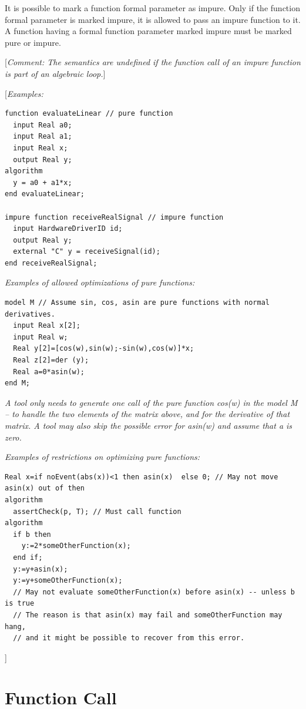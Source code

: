 \documentclass[10pt,a4paper]{report}
\def\doublelabel#1{\label{#1}}
\begin{document}
It is possible to mark a function formal parameter as impure. Only if
the function formal parameter is marked impure, it is allowed to pass an
impure function to it. A function having a formal function parameter
marked impure must be marked pure or impure.

{[}\emph{Comment: The semantics are undefined if the function call of an
impure function is part of an algebraic loop.}{]}

{[}\emph{Examples:}

\begin{lstlisting}[language=modelica]
function evaluateLinear // pure function
  input Real a0;
  input Real a1;
  input Real x;
  output Real y;
algorithm
  y = a0 + a1*x;
end evaluateLinear;

impure function receiveRealSignal // impure function
  input HardwareDriverID id;
  output Real y;
  external "C" y = receiveSignal(id);
end receiveRealSignal;
\end{lstlisting}
\emph{Examples of allowed optimizations of pure functions:}

\begin{lstlisting}[language=modelica]
model M // Assume sin, cos, asin are pure functions with normal derivatives.
  input Real x[2];
  input Real w;
  Real y[2]=[cos(w),sin(w);-sin(w),cos(w)]*x;
  Real z[2]=der (y);
  Real a=0*asin(w);
end M;
\end{lstlisting}
\emph{A tool only needs to generate one call of the pure function cos(w)
in the model M -- to handle the two elements of the matrix above, and
for the derivative of that matrix. A tool may also skip the possible
error for asin(w) and assume that a is zero.}

\emph{Examples of restrictions on optimizing pure functions:}

\begin{lstlisting}[language=modelica]
  Real x=if noEvent(abs(x))<1 then asin(x)  else 0; // May not move asin(x) out of then
algorithm
  assertCheck(p, T); // Must call function
algorithm
  if b then
    y:=2*someOtherFunction(x);
  end if;
  y:=y+asin(x);
  y:=y+someOtherFunction(x);
  // May not evaluate someOtherFunction(x) before asin(x) -- unless b is true
  // The reason is that asin(x) may fail and someOtherFunction may hang,
  // and it might be possible to recover from this error.
\end{lstlisting}
{]}

\section{Function Call}\doublelabel{function-call}
\end{document}
